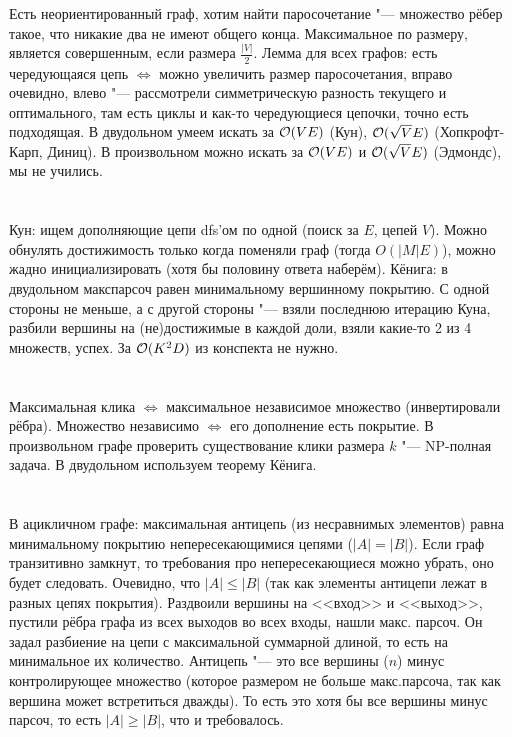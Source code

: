 \section{} %
Есть неориентированный граф, хотим найти паросочетание "--- множество рёбер такое, что никакие два не имеют общего конца.
Максимальное по размеру, является совершенным, если размера $\frac{|V|}{2}$.
Лемма для всех графов: есть чередующаяся цепь $\iff$ можно увеличить размер паросочетания, вправо очевидно, влево "--- рассмотрели симметрическую разность текущего и оптимального, там есть циклы и как-то чередующиеся цепочки, точно есть подходящая.
В двудольном умеем искать за $\mathcal{O}(VE)$ (Кун), $\mathcal{O}(\sqrt V E)$ (Хопкрофт-Карп, Диниц).
В произвольном можно искать за $\mathcal{O}(VE)$ и $\mathcal{O}(\sqrt VE)$ (Эдмондс), мы не учились.

\section{} %
Кун: ищем дополняющие цепи dfs'ом по одной (поиск за $E$, цепей $V$).
Можно обнулять достижимость только когда поменяли граф (тогда $O(|M|E)$), можно жадно инициализировать (хотя бы половину ответа наберём).
Кёнига: в двудольном макспарсоч равен минимальному вершинному покрытию.
С одной стороны не меньше, а с другой стороны "--- взяли последнюю итерацию Куна, разбили вершины на (не)достижимые в каждой доли, взяли какие-то 2 из 4 множеств, успех.
За $\mathcal{O}(K^2D)$ из конспекта не нужно.

\section{} %
Максимальная клика $\iff$ максимальное независимое множество (инвертировали рёбра).
Множество независимо $\iff$ его дополнение есть покрытие.
В произвольном графе проверить существование клики размера $k$ "--- NP-полная задача.
В двудольном используем теорему Кёнига.

\section{} %
В ацикличном графе: максимальная антицепь (из несравнимых элементов) равна минимальному покрытию непересекающимися цепями ($|A|=|B|$).
Если граф транзитивно замкнут, то требования про непересекающиеся можно убрать, оно будет следовать.
Очевидно, что $|A| \le |B|$ (так как элементы антицепи лежат в разных цепях покрытия).
Раздвоили вершины на <<вход>> и <<выход>>, пустили рёбра графа из всех выходов во всех входы, нашли макс. парсоч.
Он задал разбиение на цепи с максимальной суммарной длиной, то есть на минимальное их количество.
Антицепь "--- это все вершины ($n$) минус контролирующее множество (которое размером не больше макс.парсоча, так как вершина может встретиться дважды).
То есть это хотя бы все вершины минус парсоч, то есть $|A|\ge |B|$, что и требовалось.

